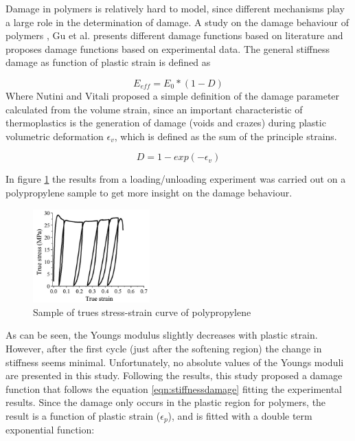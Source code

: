 Damage in polymers is relatively hard to model, since different mechanisms play a large role in the determination of damage. A study on the damage behaviour of polymers \cite{Gu2013ExperimentalThermoplastics}, Gu et al. presents different damage functions based on literature and proposes damage functions based on experimental data. 
The general stiffness damage as function of plastic strain is defined as

\begin{equation}\label{stiffnessdamage}
E_{eff}=E_0*(1-D)
\end{equation}Where Nutini and Vitali proposed a simple definition of the damage parameter calculated from the volume strain, since an important characteristic of thermoplastics is the generation of damage (voids and crazes) during plastic volumetric deformation $\epsilon_v$, which is defined as the sum of the principle strains.

\begin{equation}\label{AzziTsai}
D=1-exp(-\epsilon_v)
\end{equation}

In figure \ref{fig:damagepolymer} the results from a loading/unloading experiment was carried out on a polypropylene sample to get more insight on the damage behaviour. 

\begin{figure}[H]
    \centering
    \includegraphics[width=0.4\textwidth]{chapter_2/figures/damagepolymer.png}
    \caption{Sample of trues stress-strain curve of polypropylene\cite{Gu2013ExperimentalThermoplastics} }
    \label{fig:damagepolymer}
\end{figure}
As can be seen, the Youngs modulus slightly decreases with plastic strain. However, after the first cycle (just after the softening region) the change in stiffness seems minimal.  Unfortunately, no absolute values of the Youngs moduli are presented in this study. 
Following the results, this study proposed a damage function that follows the equation \ref{eqn:stiffnessdamage} fitting the experimental results. Since the damage only occurs in the plastic region for polymers, the result is a function of plastic strain ($\epsilon_p$), and is fitted with a double term exponential function:

